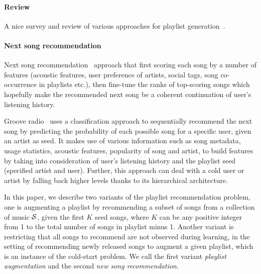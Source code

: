 \paragraph{Review}
A nice survey and review of various approaches for playlist generation~\cite{bonnin2015automated}.


\paragraph{Next song recommendation}
Next song recommendation~\cite{jannach2015beyond} approach that first scoring each song by a number of features
(\eg acoustic features, user preference of artists, social tags, song co-occurrence in playlists etc.),
then fine-tune the ranks of top-scoring songs which hopefully make the recommended next song be a coherent continuation of user's listening history.

Groove radio~\cite{ben2017groove} uses a classification approach to sequentially recommend 
the next song by predicting the probability of each possible song for a specific user, given an artist as seed.
It makes use of various information such as song metadata, usage statistics, acoustic features, popularity of song and artist,
to build features by taking into consideration of user's listening history and the playlist seed (\ie specified artist and user).
Further, this approach can deal with a cold user or artist by falling back higher levels thanks to its hierarchical architecture.


In this paper, we describe two variants of the playlist recommendation problem,
one is augmenting a playlist by recommending a subset of songs from a collection of music $\mathcal{S}$,
given the first $K$ seed songs, where $K$ can be any positive integer from 1 to the total number of songs in playlist minus 1.
Another variant is restricting that all songs to recommend are not observed during learning,
\ie in the setting of recommending newly released songs to augment a given playlist, which is an instance of the cold-start problem.
We call the first variant \emph{playlist augmentation} and the second \emph{new song recommendation}.
